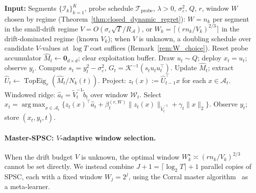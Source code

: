 \documentclass[11pt]{article}
\newcommand{\cA}{\mathcal{A}}
\newcommand{\cI}{\mathcal{I}}
\newcommand{\cTprobe}{\mathcal{T}_{\mathrm{probe}}}
\DeclareMathOperator{\TopEig}{TopEig}
\DeclareMathOperator*{\argmax}{arg\,max}
\begin{document}
\begin{algorithm}[t]
\caption{Single-Play Subspace-Calibrated Optimism (SPSC)}
\label{alg:spsc}
\begin{algorithmic}[1]
\State \textbf{Input:} Segments $\{\cI_k\}_{k=1}^K$, probe schedule $\cTprobe$,
       $\lambda>0$, $\sigma_\varepsilon^2$, $Q$, $r$, window $W$ chosen by
       regime (Theorem~\ref{thm:closed_dynamic_regret}): $W=n_k$ per segment
       in the small-drift regime $V=O(\sigma_\varepsilon\sqrt T/R_{\cA})$,
       or $W_k=\lceil(rn_k/V_k)^{2/3}\rceil$ in the drift-dominated regime
       (known $V_k$); when $V$ is unknown, a doubling schedule over candidate
       $V$-values at $\log T$ cost suffices (Remark~\ref{rem:W_choice}).
        \State Reset probe accumulator $\widehat{M}_t\leftarrow\mathbf{0}_{d\times d}$;
               clear exploitation buffer.
    \EndIf
    \If{$t\in\cTprobe$}
        \State Draw $u_t\sim Q$; deploy $x_t=u_t$; observe $y_t$.
        \State Compute $s_t=y_t^2-\sigma_\varepsilon^2$,
               $G_t=\mathcal{K}^{-1}(s_tu_tu_t^\top)$.
        \State Update $\widehat{M}_t$; extract
               $\widehat{U}_t\leftarrow\TopEig_r(\widehat{M}_t/N_k(t))$.
    \Else
        \State Project: $z_t(x):=\widehat{U}_{t-1}^\top x$ for each $x\in\cA_t$.
        \State Windowed ridge: $\widehat{a}_t=\widetilde{V}_t^{-1}\widetilde{b}_t$
               over window $\mathcal{W}_t$.
        \State Select $x_t=\argmax_{x\in\cA_t}
               \{z_t(x)^\top\widehat{a}_t
               +\beta_t^{(r,W)}\|z_t(x)\|_{\widetilde{V}_t^{-1}}
               +\gamma_t\|x\|_2\}$.
        \State Observe $y_t$; store $(x_t,y_t,t)$.
    \EndIf
\EndFor
\end{algorithmic}
\end{algorithm}

\paragraph{Master-SPSC: $V$-adaptive window selection.}
\label{par:master_spsc}
When the drift budget $V$ is unknown, the optimal window
$W_k^\star\asymp(rn_k/V_k)^{2/3}$ cannot be set directly.  We instead combine
$J+1=\lceil\log_2 T\rceil+1$ parallel copies of SPSC, each with a fixed
window $W_j=2^j$, using the Corral master
algorithm~\citep{agarwal2017corralling} as a meta-learner.
\end{document}

